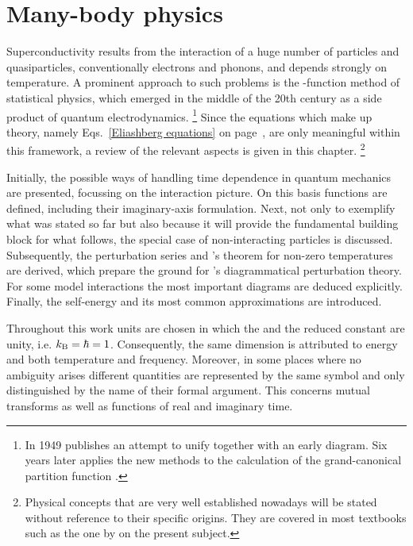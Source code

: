 
\chapter{Many-body physics}

Superconductivity results from the interaction of a huge number of particles and
quasiparticles, conventionally electrons and phonons, and depends strongly on
temperature. A prominent approach to such problems is the -function
method of statistical physics, which emerged in the middle of the 20th century
as a side product of quantum electrodynamics.%
%
\footnote{In 1949  publishes an attempt to unify  \cite{Dyson49} together with an
early  diagram. Six years later  applies the new
methods to the calculation of the grand-canonical partition function
\cite{Matsubara55}.}
%
Since the equations which make up  theory, namely
Eqs.~\ref{Eliashberg equations} on page~\pageref{Eliashberg equations}, are only
meaningful within this framework, a review of the relevant aspects is given in
this chapter.%
%
\footnote{Physical concepts that are very well established nowadays will be
stated without reference to their specific origins. They are covered in most
textbooks such as the one by  \cite{Mahan00} on the present
subject.}

Initially, the possible ways of handling time dependence in quantum mechanics
are presented, focussing on the interaction picture. On this basis 
functions are defined, including their imaginary-axis formulation. Next, not
only to exemplify what was stated so far but also because it will provide the
fundamental building block for what follows, the special case of non-interacting
particles is discussed. Subsequently, the perturbation series and 's
theorem for non-zero temperatures are derived, which prepare the ground for
's diagrammatical perturbation theory. For some model interactions
the most important diagrams are deduced explicitly. Finally, the self-energy and
its most common approximations are introduced.

Throughout this work units are chosen in which the  and the
reduced  constant are unity, i.e. $k \sb{\text{B}} = \hbar = 1$.
Consequently, the same dimension is attributed to energy and both temperature
and frequency. Moreover, in some places where no ambiguity arises different
quantities are represented by the same symbol and only distinguished by the name
of their formal argument. This concerns mutual  transforms as well
as functions of real and imaginary time.

